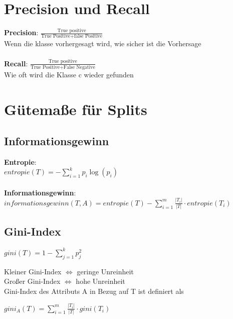 \documentclass{article}
\begin{document}
\section{Precision und Recall}
\textbf{Precision}: $\frac{\text{True positive}}{\text{True Positive} + 
\text{false Positive}}$ \\
Wenn die klasse vorhergesagt wird, wie sicher ist die Vorhersage \\
\\
\textbf{Recall}: $\frac{\text{True positive}}{\text{True Positive} + 
\text{False Negative}}$ \\
Wie oft wird die Klasse c wieder gefunden
\section{Gütemaße für Splits}
\subsection{Informationsgewinn}
\textbf{Entropie}: \\
$entropie(T) = - \sum_{i = 1}^{k} p_i \log(p_i)$ \\
\\
\textbf{Informationsgewinn}: \\
$informationsgewinn(T, A) = entropie(T) -
\sum_{i = 1}^{m} \frac{|T_i|}{|T|} \cdot entropie(T_i)$
\subsection{Gini-Index}
\begin{center}
    $gini(T) = 1 - \sum_{j = 1}^k p_j^2$
\end{center}
Kleiner Gini-Index $\Leftrightarrow$ geringe Unreinheit \\
Großer Gini-Index $\Leftrightarrow$ hohe Unreinheit \\
Gini-Index des Attributs A in Bezug auf T ist definiert als
\begin{center}
    $gini_A(T) = \sum_{i = 1}^m \frac{|T_i|}{|T|} \cdot gini(T_i)$
\end{center}
\end{document}
